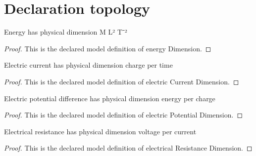 \section{Declaration topology}
\begin{definition}
  \label{def:physics:phyx-mini-0934:phyxminiproblems-problemphyxmini0934-energydimension}
  Energy has physical dimension M L² T⁻²
\end{definition}
\begin{proof}
  This is the declared model definition of energy Dimension.
\end{proof}
\begin{definition}
  \label{def:physics:phyx-mini-0934:phyxminiproblems-problemphyxmini0934-electriccurrentdimension}
  Electric current has physical dimension charge per time
\end{definition}
\begin{proof}
  This is the declared model definition of electric Current Dimension.
\end{proof}
\begin{definition}
  \label{def:physics:phyx-mini-0934:phyxminiproblems-problemphyxmini0934-electricpotentialdimension}
  Electric potential difference has physical dimension energy per charge
\end{definition}
\begin{proof}
  This is the declared model definition of electric Potential Dimension.
\end{proof}
\begin{definition}
  \label{def:physics:phyx-mini-0934:phyxminiproblems-problemphyxmini0934-electricalresistancedimension}
  Electrical resistance has physical dimension voltage per current
\end{definition}
\begin{proof}
  This is the declared model definition of electrical Resistance Dimension.
\end{proof}
